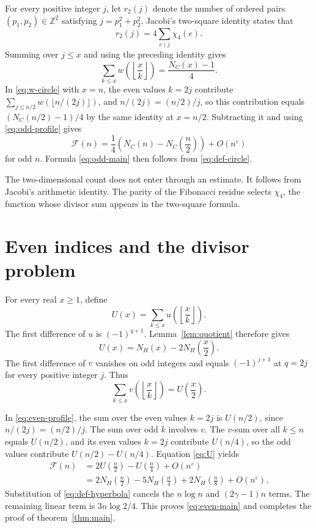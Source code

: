 \documentclass[11pt]{article}
\newcommand{\FF}{\mathcal F}
\newcommand{\eps}{\varepsilon}
\begin{document}
For every positive integer $j$, let $r_2(j)$ denote the number of ordered
pairs $(p_1,p_2)\in\mathbb Z^2$ satisfying $j=p_1^2+p_2^2$. Jacobi's two-square
identity states that
\[
 r_2(j)=4\sum_{e\mid j}\chi_4(e).
\]
Summing over $j\leq x$ and using the preceding identity gives
\begin{equation}\label{eq:w-circle}
 \sum_{k\leq x}w\left(\left\lfloor\frac{x}{k}\right\rfloor\right)
 =\frac{N_C(x)-1}{4}.
\end{equation}
In \eqref{eq:w-circle} with $x=n$, the even values $k=2j$ contribute
$\sum_{j\leq n/2}w(\lfloor n/(2j)\rfloor)$, and $n/(2j)=(n/2)/j$, so this
contribution equals $(N_C(n/2)-1)/4$ by the same identity at $x=n/2$.
Subtracting it and using \eqref{eq:odd-profile} gives
\[
 \FF(n)=\frac14\left(N_C(n)-N_C\left(\frac n2\right)\right)
 +O(n^\eps)
\]
for odd $n$. Formula \eqref{eq:odd-main} then follows from
\eqref{eq:def-circle}.

The two-dimensional count does not enter through an estimate. It follows from
Jacobi's arithmetic identity. The parity of the Fibonacci residue selects
$\chi_4$, the function whose divisor sum appears in the two-square formula.

\section{Even indices and the divisor problem}

For every real $x\geq 1$, define
\[
 U(x)=\sum_{k\leq x}u\left(\left\lfloor\frac{x}{k}\right\rfloor\right).
\]
The first difference of $u$ is $(-1)^{q+1}$. Lemma~\ref{lem:quotient}
therefore gives
\begin{equation}\label{eq:U}
 U(x)=N_H(x)-2N_H\left(\frac x2\right).
\end{equation}
The first difference of $v$ vanishes on odd integers and equals
$(-1)^{j+1}$ at $q=2j$ for every positive integer $j$. Thus
\[
 \sum_{k\leq x}v\left(\left\lfloor\frac{x}{k}\right\rfloor\right)
 =U\left(\frac x2\right).
\]

In \eqref{eq:even-profile}, the sum over the even values $k=2j$ is
$U(n/2)$, since $n/(2j)=(n/2)/j$. The sum over odd $k$ involves $v$. The
$v$-sum over all $k\leq n$ equals $U(n/2)$, and its even values $k=2j$
contribute $U(n/4)$, so the odd values contribute $U(n/2)-U(n/4)$.
Equation \eqref{eq:U} yields
\begin{align*}
 \FF(n)
 &=2U\left(\frac n2\right)-U\left(\frac n4\right)+O(n^\eps)
 \\
 &=2N_H\left(\frac n2\right)-5N_H\left(\frac n4\right)
 +2N_H\left(\frac n8\right)+O(n^\eps).
\end{align*}
Substitution of \eqref{eq:def-hyperbola} cancels the $n\log n$ and
$(2\gamma-1)n$ terms. The remaining linear
term is $3n\log 2/4$. This proves \eqref{eq:even-main} and completes the
proof of theorem~\ref{thm:main}.
\end{document}
